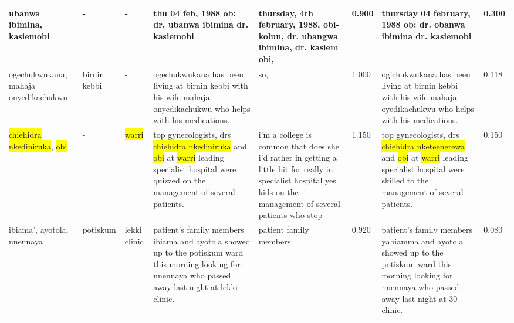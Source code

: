 \begin{table}[h]
\begin{tabular}{p{1cm}p{1cm}p{1cm}p{2.3cm}p{2.3cm}p{1cm}p{2.3cm}p{1cm}}
\hline
ubanwa ibimina, kasiemobi & - & - & thu 04 feb, 1988 ob: dr. ubanwa ibimina dr. kasiemobi & thursday, 4th february, 1988, obi-kolun, dr. ubangwa ibimina, dr. kasiem obi, & 0.900 & thursday 04 february, 1988 ob: dr. obanwa ibimina dr. kasiemobi & 0.300 \\
\hline
ogechukwukana, mahaja onyedikachukwu & birnin kebbi & - & ogechukwukana has been living at birnin kebbi with his wife mahaja onyedikachukwu who helps with his medications. & so, & 1.000 & ogichukwukana has been living at birnin kebbi with his wife mahaja oyedikachukwu who helps with his medications. & 0.118 \\
\hline
\colorbox{yellow}{chiehidra nkediniruka}, \colorbox{yellow}{obi} & - & \colorbox{yellow}{warri} & top gynecologists, drs \colorbox{yellow}{chiehidra nkediniruka} and \colorbox{yellow}{obi} at \colorbox{yellow}{warri} leading specialist hospital were quizzed on the management of several patients. & i'm a college is common that does she i'd rather in getting a little bit for really in specialist hospital yes kids on the management of several patients who stop & 1.150 & top gynecologists, drs \colorbox{yellow}{chiehidra nketeenerewa} and \colorbox{yellow}{obi} at \colorbox{yellow}{warri} leading specialist hospital were skilled to the management of several patients. & 0.150 \\
\hline
ibiama', ayotola, nnennaya & potiskum & lekki clinic & patient's family members ibiama and ayotola showed up to the potiskum ward this morning looking for nnennaya who passed away last night at lekki clinic. & patient family members & 0.920 & patient's family members yabiamma and ayotola showed up to the potiskum ward this morning looking for nnennaya who passed away last night at 30 clinic. & 0.080 \\
\bottomrule
\end{tabular}
    \label{apdx:nigeria_ner2}
\end{table}

